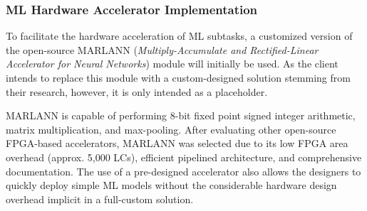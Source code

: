 \subsubsection{ML Hardware Accelerator Implementation}
To facilitate the hardware acceleration of ML subtasks, a customized version of the open-source MARLANN (\textit{Multiply-Accumulate and Rectified-Linear Accelerator for Neural Networks}) module will initially be used\cite{marlann}. As the client intends to replace this module with a custom-designed solution stemming from their research, however, it is only intended as a placeholder.

MARLANN is capable of performing 8-bit fixed point signed integer arithmetic, matrix multiplication, and max-pooling. After evaluating other open-source FPGA-based accelerators, MARLANN was selected due to its low FPGA area overhead (approx. 5,000 LCs), efficient pipelined architecture, and comprehensive documentation. The use of a pre-designed accelerator also allows the designers to quickly deploy simple ML models without the considerable hardware design overhead implicit in a full-custom solution.
